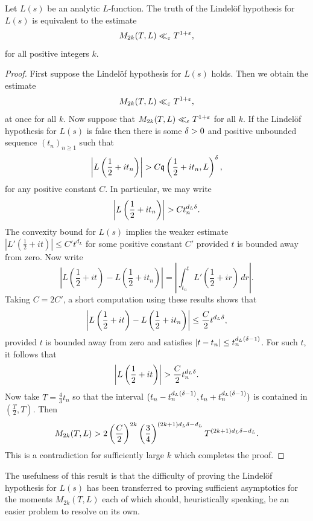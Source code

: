     \begin{proposition}\label{prop:equivalence_Lindelof_hypothesis_and_moments}
      Let \(L(s)\) be an analytic \(L\)-function. The truth of the Lindel\"of hypothesis for \(L(s)\) is equivalent to the estimate
      \[
        M_{2k}(T,L) \ll_{\varepsilon} T^{1+\varepsilon},
      \]
      for all positive integers \(k\).
    \end{proposition}
    \begin{proof}
      First suppose the Lindel\"of hypothesis for \(L(s)\) holds. Then we obtain the estimate
      \[
        M_{2k}(T,L) \ll_{\varepsilon} T^{1+\varepsilon},
      \]
      at once for all \(k\). Now suppose that \(M_{2k}(T,L) \ll_{\varepsilon} T^{1+\varepsilon}\) for all \(k\). If the Lindel\"of hypothesis for \(L(s)\) is false then there is some \(\delta > 0\) and positive unbounded sequence \((t_{n})_{n \ge 1}\) such that
      \[
        \left|L\left(\frac{1}{2}+it_{n}\right)\right| > C\mathfrak{q}\left(\frac{1}{2}+it_{n},L\right)^{\delta},
      \]
      for any positive constant \(C\). In particular, we may write
        \[
        \left|L\left(\frac{1}{2}+it_{n}\right)\right| > Ct_{n}^{d_{L}\delta}.
      \]
      The convexity bound for \(L(s)\) implies the weaker estimate \(\left|L'\left(\frac{1}{2}+it\right)\right| \le C't^{d_{L}}\) for some positive constant \(C'\) provided \(t\) is bounded away from zero. Now write
      \[
        \left|L\left(\frac{1}{2}+it\right)-L\left(\frac{1}{2}+it_{n}\right)\right| = \left|\int_{t_{n}}^{t}L'\left(\frac{1}{2}+ir\right)\,dr\right|.
      \]
      Taking \(C = 2C'\), a short computation using these results shows that
      \[
        \left|L\left(\frac{1}{2}+it\right)-L\left(\frac{1}{2}+it_{n}\right)\right| \le \frac{C}{2}t^{d_{L}\delta},
      \]
      provided \(t\) is bounded away from zero and satisfies \(|t-t_{n}| \le t_{n}^{d_{L}(\delta-1)}\). For such \(t\), it follows that
      \[
        \left|L\left(\frac{1}{2}+it\right)\right| > \frac{C}{2}t_{n}^{d_{L}\delta}.
      \]
      Now take \(T = \frac{4}{3}t_{n}\) so that the interval \((t_{n}-t_{n}^{d_{L}(\delta-1)},t_{n}+t_{n}^{d_{L}(\delta-1)})\) is contained in \(\left(\frac{T}{2},T\right)\). Then
      \[
        M_{2k}(T,L) > 2\left(\frac{C}{2}\right)^{2k}\left(\frac{3}{4}\right)^{(2k+1)d_{L}\delta-d_{L}}T^{(2k+1)d_{L}\delta-d_{L}}.
      \]
      This is a contradiction for sufficiently large \(k\) which completes the proof.
    \end{proof}

    The usefulness of this result is that the difficulty of proving the Lindel\"of hypothesis for \(L(s)\) has been transferred to proving sufficient asymptotics for the moments \(M_{2k}(T,L)\) each of which should, heuristically speaking, be an easier problem to resolve on its own.
